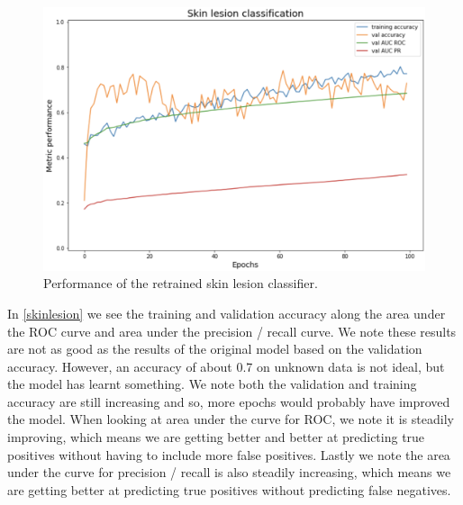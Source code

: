 \begin{figure}
	\centering
	\includegraphics[width=0.88\linewidth]{Materials/skinlesion}
	\caption{Performance of the retrained skin lesion classifier.}
	\label{skinlesion}
\end{figure}
In \autoref{skinlesion} we see the training and validation accuracy along the area under the ROC curve and area under the precision / recall curve. We note these results are not as good as the results of the original model based on the validation accuracy. However, an accuracy of about 0.7 on unknown data is not ideal, but the model has learnt something. We note both the validation and training accuracy are still increasing and so, more epochs would probably have improved the model. When looking at area under the curve for ROC, we note it is steadily improving, which means we are getting better and better at predicting true positives without having to include more false positives. Lastly we note the area under the curve for precision / recall is also steadily increasing, which means we are getting better at predicting true positives without predicting false negatives. 